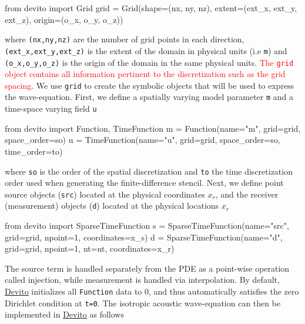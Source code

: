 \documentclass[10pt, conference]{IEEEtran}
\newcommand{\devito}{\href{https://github.com/devitocodes/devito}{Devito} }
\begin{document}
\begin{python}[label=grid, caption=Grid creation]
from devito import Grid
grid = Grid(shape=(nx, ny, nz),
            extent=(ext_x, ext_y, ext_z),
            origin=(o_x, o_y, o_z))
\end{python}
\noindent
where \texttt{(nx,\phantom{\ }ny,\phantom{\ }nz)} are the number of grid
points in each direction,
\texttt{(ext\_x,\phantom{\ }ext\_y,\phantom{\ }ext\_z)} is the
extent of the domain in physical units (i.e \texttt{m}) and
\texttt{(o\_x,\phantom{\ }o\_y,\phantom{\ }o\_z)} is the origin of the
domain in the same physical units. \textcolor{red}{The \texttt{grid} object contains all
information pertinent to the discretization such as the grid spacing}.
We use \texttt{grid} to create the symbolic objects that will be used to
express the wave-equation. First, we define a spatially varying model
parameter \texttt{m} and a time-space varying field \texttt{u}

\begin{python}[label=function, caption=Function definition]
from devito import Function, TimeFunction
m = Function(name="m", grid=grid,
             space_order=so)
u = TimeFunction(name="u", grid=grid,
                 space_order=so,
                 time_order=to)
\end{python}
\noindent
where \texttt{so} is the order of the spatial discretization and \texttt{to}
the time discretization order used when generating the
finite-difference stencil. Next, we define point source objects (\texttt{src}) located at the physical
coordinates $x_r$, and the receiver (measurement) objects (\texttt{d})
located at the physical locations $x_r$

\begin{python}[label=sparse, caption=SparseFunction definition]
from devito import SparseTimeFunction
s = SparseTimeFunction(name="src",
                       grid=grid, npoint=1,
                       coordinates=x_s)
d = SparseTimeFunction(name="d", grid=grid,
                       npoint=1, nt=nt,
                       coordinates=x_r)
\end{python}

The source term is handled separately from the PDE as a point-wise
operation called injection, while measurement is handled via
interpolation. By default, \devito initializes all \texttt{Function} data
to 0, and thus automatically satisfies the zero Dirichlet condition at
\texttt{t=0}. The isotropic acoustic wave-equation can then be implemented
in \devito as follows
\end{document}

